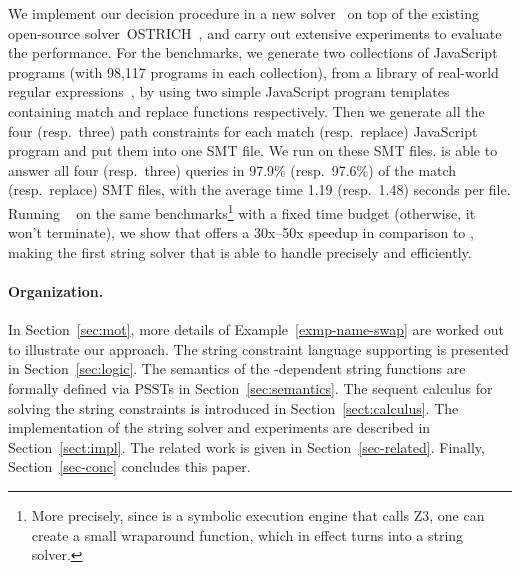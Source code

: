 We implement our decision procedure in a new solver \ostrich\  
on top of the existing open-source solver~OSTRICH~\cite{CHL+19},
and carry out extensive experiments to evaluate the performance. For the benchmarks, we generate two collections of JavaScript programs (with 98,117 programs in each collection), from a library of real-world regular expressions~\cite{DMC+19}, by using two simple JavaScript program templates containing match and replace functions respectively.  
 Then we generate all the four (resp.\ three) path constraints for each match (resp.\ replace) JavaScript program and put them into one SMT file. We run {\ostrich} on these SMT files. {\ostrich} is able to answer all four (resp.\ three) queries in 97.9\% (resp.\ 97.6\%) of the match (resp.\ replace) SMT files, with the average time 1.19 (resp.\ 1.48) seconds per file. 
Running \expose{}~\cite{LMK19} on the same benchmarks\footnote{More precisely, since
\expose{} is a symbolic execution engine that calls Z3, one can create a small 
wraparound function, which in effect turns \expose{} into a string solver.}
with a fixed time budget (otherwise, 
it won't terminate), we show that \ostrich{} offers a 30x--50x speedup in 
comparison to \expose{}, making \ostrich{} the first string solver that
is able to handle \regexps{} precisely and efficiently.

\paragraph{Organization.} In Section~\ref{sec:mot}, more details of Example~\ref{exmp-name-swap} are worked out to illustrate our approach. The string constraint language supporting {\regexps} is presented in Section~\ref{sec:logic}. The semantics of the {\regexp}-dependent string functions are formally defined via PSSTs in Section~\ref{sec:semantics}. The sequent calculus for solving the string constraints is introduced in Section~\ref{sect:calculus}. The implementation of the string solver and experiments are described in Section~\ref{sect:impl}. The related work is given in Section~\ref{sec-related}. Finally, Section~\ref{sec-conc} concludes this paper.

